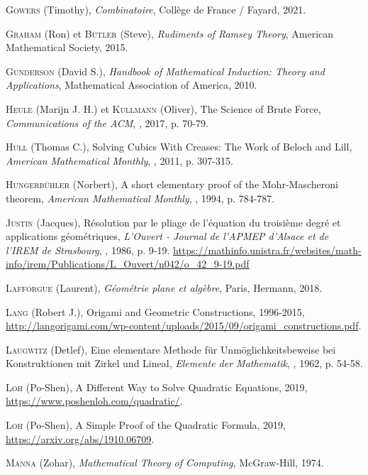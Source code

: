 \begin{thebibliography}{99}
\textsc{Gowers} (Timothy), \emph{Combinatoire}, Collège de France / Fayard, 2021.

  \textsc{Graham} (Ron) et \textsc{Butler} (Steve), \emph{Rudiments of Ramsey Theory}, American Mathematical Society, 2015.


  \textsc{Gunderson} (David S.), \emph{Handbook of Mathematical Induction: Theory and Applications}, Mathematical Association of America, 2010.

  \textsc{Heule} (Marijn J. H.) et \textsc{Kullmann} (Oliver), \og The Science of Brute Force\fg, \emph{Communications of the ACM}, , 2017, p. 70-79.


  \textsc{Hull} (Thomas C.), \og Solving Cubics With Creases: The Work of {Beloch} and {Lill}\fg, \emph{American Mathematical Monthly}, , 2011, p. 307-315.

  \textsc{Hungerbühler} (Norbert), \og A short elementary proof of the {Mohr-Mascheroni} theorem\fg, \emph{American Mathematical Monthly}, , 1994, p. 784-787.


\textsc{Justin} (Jacques), \og Résolution par le pliage de l'équation du troisième degré et applications géométriques\fg, \emph{L'Ouvert - Journal de l'APMEP d'Alsace et de l'IREM de Strasbourg}, , 1986, p. 9-19. \url{https://mathinfo.unistra.fr/websites/math-info/irem/Publications/L_Ouvert/n042/o_42_9-19.pdf}

\textsc{Lafforgue} (Laurent), \emph{Géométrie plane et algèbre}, Paris, Hermann, 2018.

  \textsc{Lang} (Robert J.), \og Origami and Geometric Constructions\fg, 1996-2015, \url{http://langorigami.com/wp-content/uploads/2015/09/origami_constructions.pdf}.

  \textsc{Laugwitz} (Detlef), \og Eine elementare {Methode} f\"{u}r {Unm\"{o}glichkeitsbeweise} bei {Konstruktionen} mit {Zirkel} und {Lineal}\fg, \emph{Elemente der Mathematik}, , 1962, p. 54-58.

  \textsc{Loh} (Po-Shen), \og A Different Way to Solve Quadratic Equations\fg, 2019, \url{https://www.poshenloh.com/quadratic/}.


  \textsc{Loh} (Po-Shen), \og A Simple Proof of the Quadratic Formula\fg, 2019, \url{https://arxiv.org/abs/1910.06709}.


  \textsc{Manna} (Zohar), \emph{Mathematical Theory of Computing}, McGraw-Hill, 1974.




\end{thebibliography}
